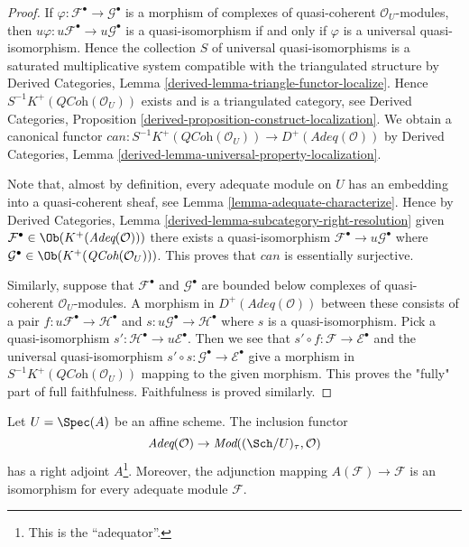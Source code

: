 \begin{proof}
If $\varphi : \mathcal{F}^\bullet \to \mathcal{G}^\bullet$
is a morphism of complexes of quasi-coherent
$\mathcal{O}_U$-modules, then $u\varphi : u\mathcal{F}^\bullet \to
u\mathcal{G}^\bullet$ is a quasi-isomorphism if and only if $\varphi$ is
a universal quasi-isomorphism. Hence the collection $S$
of universal quasi-isomorphisms is a saturated multiplicative
system compatible with the triangulated structure by
Derived Categories, Lemma \ref{derived-lemma-triangle-functor-localize}.
Hence $S^{-1}K^+(\textit{QCoh}(\mathcal{O}_U))$ exists and is a
triangulated category, see
Derived Categories, Proposition
\ref{derived-proposition-construct-localization}.
We obtain a canonical functor
$can : S^{-1}K^+(\textit{QCoh}(\mathcal{O}_U)) \to
D^{+}(\textit{Adeq}(\mathcal{O}))$ by
Derived Categories, Lemma \ref{derived-lemma-universal-property-localization}.

\medskip\noindent
Note that, almost by definition, every adequate module on $U$ has an
embedding into a quasi-coherent sheaf, see
Lemma \ref{lemma-adequate-characterize}. Hence by
Derived Categories, Lemma \ref{derived-lemma-subcategory-right-resolution}
given $\mathcal{F}^\bullet \in \Ob(K^+(\textit{Adeq}(\mathcal{O})))$
there exists a quasi-isomorphism
$\mathcal{F}^\bullet \to u\mathcal{G}^\bullet$
where $\mathcal{G}^\bullet \in \Ob(K^+(\textit{QCoh}(\mathcal{O}_U)))$.
This proves that $can$ is essentially surjective.

\medskip\noindent
Similarly, suppose that $\mathcal{F}^\bullet$ and $\mathcal{G}^\bullet$
are bounded below complexes of quasi-coherent $\mathcal{O}_U$-modules.
A morphism in $D^+(\textit{Adeq}(\mathcal{O}))$ between these
consists of a pair $f : u\mathcal{F}^\bullet \to \mathcal{H}^\bullet$
and $s : u\mathcal{G}^\bullet \to \mathcal{H}^\bullet$ where $s$
is a quasi-isomorphism. Pick a quasi-isomorphism
$s' : \mathcal{H}^\bullet \to u\mathcal{E}^\bullet$. Then we see that
$s' \circ f : \mathcal{F} \to \mathcal{E}^\bullet$ and the
universal quasi-isomorphism
$s' \circ s : \mathcal{G}^\bullet \to \mathcal{E}^\bullet$ give
a morphism in $S^{-1}K^{+}(\textit{QCoh}(\mathcal{O}_U))$ mapping
to the given morphism. This proves the "fully" part of full faithfulness.
Faithfulness is proved similarly.
\end{proof}

\begin{lemma}
\label{lemma-right-adjoint-adequate}
Let $U = \Spec(A)$ be an affine scheme.
The inclusion functor
$$
\textit{Adeq}(\mathcal{O}) \to
\textit{Mod}((\Sch/U)_\tau, \mathcal{O})
$$
has a right adjoint $A$\footnote{This is the ``adequator''.}.
Moreover, the adjunction mapping
$A(\mathcal{F}) \to \mathcal{F}$ is an isomorphism for every
adequate module $\mathcal{F}$.
\end{lemma}


